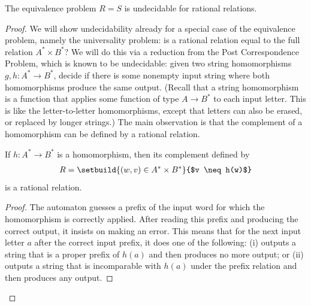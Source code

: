 \begin{theorem}\label{thm:undecidable-equivalence-rational-relations}
    The equivalence problem $R=S$ is undecidable for rational relations.
\end{theorem}
\begin{proof}
    We will show undecidability already for a special case of the equivalence problem, namely the universality problem: is a rational relation equal to the full relation $A^* \times B^*$?  We will do this via a reduction from the Post Correspondence Problem, which is known to be undecidable: given two string homomorphisms $g,h : A^* \to B^*$, decide if there is some nonempty input string where both homomorphisms produce the same output. (Recall that a string homomorphism is a function that applies some function of type $A \to B^*$ to each input letter. This is like the letter-to-letter homomorphisms, except that letters can also be erased, or replaced by longer strings.)    The main observation is that the complement of a homomorphism can be defined by a rational relation. 

    \begin{claim}\label{claim:homomorphism-complement-rational}
        If $h : A^* \to B^*$ is a homomorphism, then its complement defined by
        \begin{align*}
        R = \setbuild{ (w,v) \in A^* \times B^*}{$v \neq h(w)$}
        \end{align*} 
        is a rational relation.
    \end{claim}
    \begin{proof}
        The automaton guesses a prefix of the input word for which the homomorphism is correctly applied. After reading this prefix and producing the correct output, it insists on making an error. This means that for the next input letter $a$ after the correct input prefix, it does one of the following: (i) outputs a string that is a proper prefix of $h(a)$ and then produces no more output; or (ii) outputs a string that is  incomparable with $h(a)$ under the prefix relation and then produces any output.
    \end{proof}


\end{proof}

